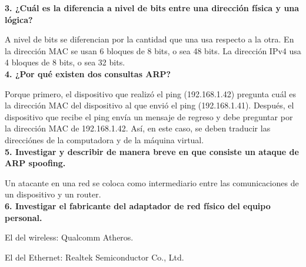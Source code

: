 \documentclass{article}
\begin{document}
\textbf{3. ¿Cuál es la diferencia a nivel de bits entre una dirección física y una lógica?}

A nivel de bits se diferencian por la cantidad que una usa respecto a la otra. En la dirección MAC se usan 6 bloques de 8 bits, o sea 48 bits. La dirección IPv4 usa 4 bloques de 8 bits, o sea 32 bits.\\

\textbf{4. ¿Por qué existen dos consultas ARP?}

Porque primero, el dispositivo que realizó el ping (192.168.1.42) pregunta cuál es la dirección MAC del dispositivo al que envió el ping (192.168.1.41). Después, el dispositivo que recibe el ping envía un mensaje de regreso y debe preguntar por la dirección MAC de 192.168.1.42. Así, en este caso, se deben traducir las direcciónes de la computadora y de la máquina virtual.\\

\textbf{5. Investigar y describir de manera breve en que consiste un ataque de ARP spoofing.}

Un atacante en una red se coloca como intermediario entre las comunicaciones de un dispositivo y un router.\\

\textbf{6. Investigar el fabricante del adaptador de red físico del equipo personal.}

El del wireless: Qualcomm Atheros.

El del Ethernet: Realtek Semiconductor Co., Ltd.
\end{document}
